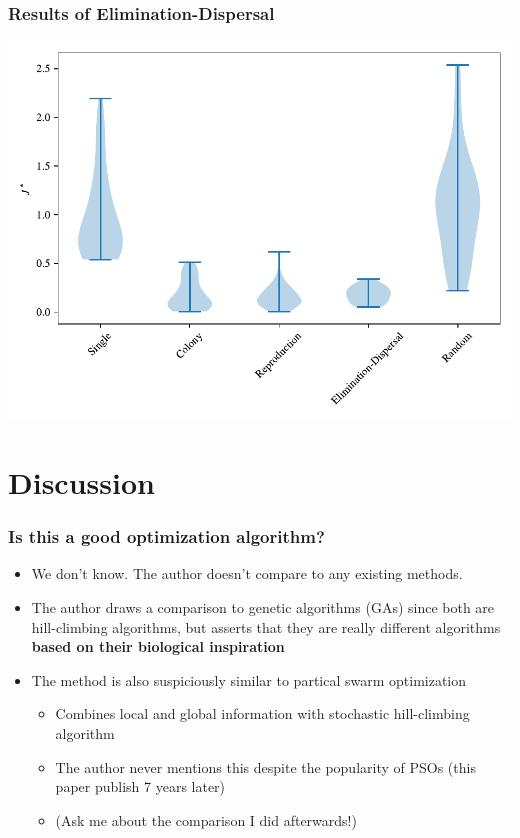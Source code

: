 \documentclass{beamer}
\begin{document}
\begin{frame}
\frametitle{Results of Elimination-Dispersal}
\begin{center}
\includegraphics[scale=0.5]{assets/compared}
\end{center}
\end{frame}

\section{Discussion}

\begin{frame}
\frametitle{Is this a good optimization algorithm?}
\begin{itemize}
  \item<2-> We don't know. The author doesn't compare to any existing methods.
  \item<3-> The author draws a comparison to genetic algorithms (GAs) since both are hill-climbing algorithms, but asserts that they are really different algorithms \textbf{based on their biological inspiration}
  \item<4-> The method is also suspiciously similar to partical swarm optimization
  \begin{itemize}
    \item<5-> Combines local and global information with stochastic hill-climbing algorithm
    \item<5-> The author never mentions this despite the popularity of PSOs (this paper publish 7 years later)
    \item<6-> (Ask me about the comparison I did afterwards!)
  \end{itemize}
\end{itemize}
\end{frame}
\end{document}
